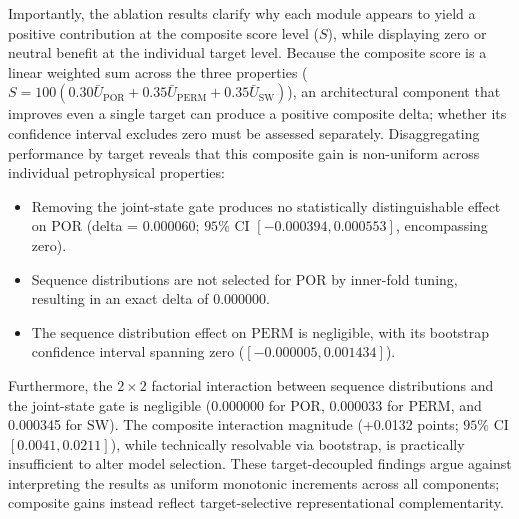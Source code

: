 \documentclass[preprint,12pt,nopreprintline]{elsarticle}
\begin{document}
Importantly, the ablation results clarify why each module appears to yield a positive contribution at the composite score level ($S$), while displaying zero or neutral benefit at the individual target level. Because the composite score is a linear weighted sum across the three properties ($S = 100(0.30\bar{U}_{\mathrm{POR}} + 0.35\bar{U}_{\mathrm{PERM}} + 0.35\bar{U}_{\mathrm{SW}})$), an architectural component that improves even a single target can produce a positive composite delta; whether its confidence interval excludes zero must be assessed separately. Disaggregating performance by target reveals that this composite gain is non-uniform across individual petrophysical properties:
\begin{itemize}
\item Removing the joint-state gate produces no statistically distinguishable effect on $\mathrm{POR}$ (delta = 0.000060; $95\%$ CI $[-0.000394, 0.000553]$, encompassing zero).
\item Sequence distributions are not selected for $\mathrm{POR}$ by inner-fold tuning, resulting in an exact delta of 0.000000.
\item The sequence distribution effect on $\mathrm{PERM}$ is negligible, with its bootstrap confidence interval spanning zero ($[-0.000005, 0.001434]$).
\end{itemize}
Furthermore, the $2 \times 2$ factorial interaction between sequence distributions and the joint-state gate is negligible (0.000000 for $\mathrm{POR}$, 0.000033 for $\mathrm{PERM}$, and 0.000345 for $\mathrm{SW}$). The composite interaction magnitude (+0.0132 points; $95\%$ CI $[0.0041, 0.0211]$), while technically resolvable via bootstrap, is practically insufficient to alter model selection. These target-decoupled findings argue against interpreting the results as uniform monotonic increments across all components; composite gains instead reflect target-selective representational complementarity.
\end{document}
